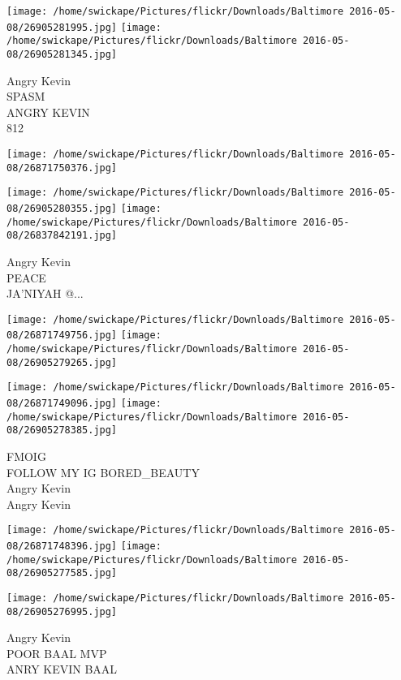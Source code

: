 \documentclass[10pt,letterpaper]{article}
\begin{document}
\texttt{[image: /home/swickape/Pictures/flickr/Downloads/Baltimore 2016-05-08/26905281995.jpg]}
\texttt{[image: /home/swickape/Pictures/flickr/Downloads/Baltimore 2016-05-08/26905281345.jpg]}

Angry Kevin\\
SPASM\\
ANGRY KEVIN\\
812\\
\pagebreak

\texttt{[image: /home/swickape/Pictures/flickr/Downloads/Baltimore 2016-05-08/26871750376.jpg]}

\vspace{0.25in}
\texttt{[image: /home/swickape/Pictures/flickr/Downloads/Baltimore 2016-05-08/26905280355.jpg]}
\texttt{[image: /home/swickape/Pictures/flickr/Downloads/Baltimore 2016-05-08/26837842191.jpg]}

Angry Kevin\\
PEACE\\
JA'NIYAH @...\\
\pagebreak

\texttt{[image: /home/swickape/Pictures/flickr/Downloads/Baltimore 2016-05-08/26871749756.jpg]}
\texttt{[image: /home/swickape/Pictures/flickr/Downloads/Baltimore 2016-05-08/26905279265.jpg]}

\texttt{[image: /home/swickape/Pictures/flickr/Downloads/Baltimore 2016-05-08/26871749096.jpg]}
\texttt{[image: /home/swickape/Pictures/flickr/Downloads/Baltimore 2016-05-08/26905278385.jpg]}

FMOIG\\
FOLLOW MY IG BORED\_BEAUTY\\
Angry Kevin\\
Angry Kevin\\
\pagebreak

\texttt{[image: /home/swickape/Pictures/flickr/Downloads/Baltimore 2016-05-08/26871748396.jpg]}
\texttt{[image: /home/swickape/Pictures/flickr/Downloads/Baltimore 2016-05-08/26905277585.jpg]}

\texttt{[image: /home/swickape/Pictures/flickr/Downloads/Baltimore 2016-05-08/26905276995.jpg]}

Angry Kevin\\
POOR BAAL MVP\\
ANRY KEVIN BAAL\\
\pagebreak
\end{document}
